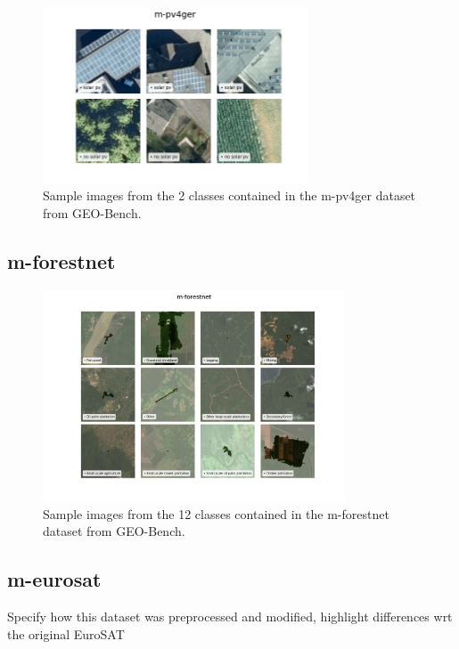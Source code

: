 \documentclass[a4paper, oneside, english]{sapthesis}
\begin{document}
\begin{figure}[h]
    \centering
    \includegraphics[width=0.7\textwidth]{img/m-pv4ger_image_grid.png}
    \caption{Sample images from the 2 classes contained in the m-pv4ger dataset from GEO-Bench.}
    \label{fig:solargrid}
\end{figure}


\subsection{m-forestnet}


\begin{figure}[h]
    \centering
    \includegraphics[width=0.8\textwidth]{img/m-forestnet_image_grid.png}
    \caption{Sample images from the 12 classes contained in the m-forestnet dataset from GEO-Bench.}
    \label{fig:forestnetgrid}
\end{figure}


\subsection{m-eurosat}

Specify how this dataset was preprocessed and modified, highlight differences wrt the original EuroSAT
\end{document}

